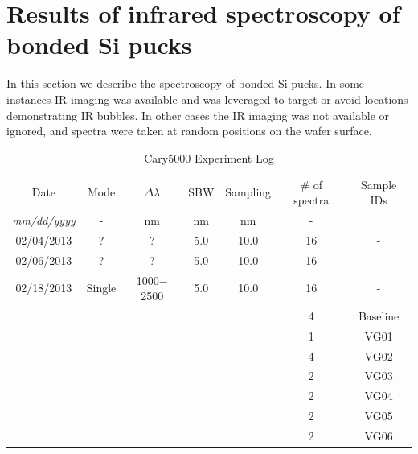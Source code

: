 \documentclass[osajnl,preprint,showpacs,superscriptaddress,12pt]{revtex4-1} %
\begin{document}
\section{Results of infrared spectroscopy of bonded Si pucks}
\label{secResults}
In this section we describe the spectroscopy of bonded Si pucks.  In some instances IR imaging was available and was leveraged to target or avoid locations demonstrating IR bubbles.  In other cases the IR imaging was not available or ignored, and spectra were taken at random positions on the wafer surface.  

\begin{table}[h!]
\caption{Cary5000 Experiment Log \label{tabExperiments}}
\begin{center}
    \begin{tabular}{c c c c c c c}
    \hline
	Date &  Mode  & $\Delta \lambda$ & SBW & Sampling & \# of spectra & Sample IDs \\
	\emph{mm/dd/yyyy} &  -  & nm & nm & nm & - \\
     \hline		
	02/04/2013 & ? & ? 				& 5.0 & 10.0 &  16 &   -  \\
     \hline		
	02/06/2013 & ? & ? 				& 5.0 & 10.0 &  16 &   -  \\	     
     \hline		
     	02/18/2013 & Single & 1000$-$2500 & 5.0 & 10.0 &  16 &   -  \\
     	                   &            &                       &       &         &    4 &  Baseline\\	
     	                   &            &                       &       &         &    1 &  VG01\\
	                   &            &                       &       &         &    4 &  VG02\\	                   
	                   &            &                       &       &         &    2 &  VG03\\	                   
	                   &            &                       &       &         &    2 &  VG04\\
	                   &            &                       &       &         &    2 &  VG05\\	                   
	                   &            &                       &       &         &    2 &  VG06\\
    \hline

\end{tabular}
\end{center}
\end{table}
\end{document}
